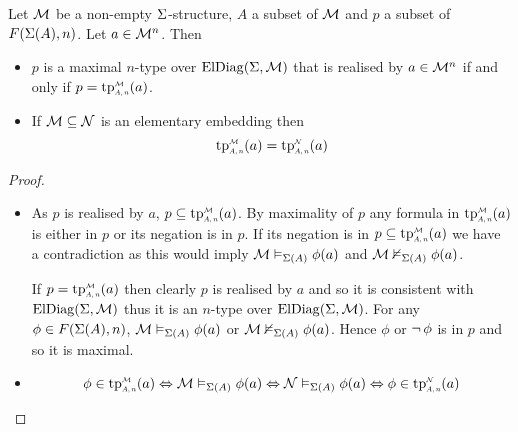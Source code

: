 \begin{prop}
    Let $\mathcal{M}$ be a non-empty $\Sigma$-structure,
    $A$ a subset of ${\mathcal{M}}$ and $p$ a subset of $F(\Sigma(A),n)$.
    Let $a \in {\mathcal{M}}^n$.
    Then \begin{itemize}
        \item $p$ is a maximal $n$-type over $\mathrm{ElDiag}(\Sigma,\mathcal{M})$ 
            that is realised by $a \in {\mathcal{M}}^n$ 
            if and only if $p = \subintp{A,n}{\MM}{\tp}(a)$.
        \item If $\mathcal{M} \subseteq \mathcal{N}$ is an elementary embedding then
            \[\subintp{A,n}{\MM}{\tp}(a) = \subintp{A,n}{\NN}{\tp}(a)\]
    \end{itemize}
\end{prop}
\begin{proof}~\begin{itemize}
    \item \begin{forward}
        As $p$ is realised by $a$, 
        $p \subs \subintp{A,n}{\MM}{\tp}(a)$.
        By maximality of $p$ any formula in $\subintp{A,n}{\MM}{\tp}(a)$ 
        is either in $p$
        or its negation is in $p$.
        If its negation is in $p \subs \subintp{A,n}{\MM}{\tp}(a)$ we have a
        contradiction as this would imply $\mathcal{M} \vDash_{\Sigma(A)} \phi(a)$ and
        $\mathcal{M} \nvDash_{\Sigma(A)} \phi(a)$.
    \end{forward}
    \begin{backward}
        If $p = \subintp{A,n}{\MM}{\tp}(a)$ 
        then clearly $p$ is realised by $a$ and so it is consistent with 
        $\mathrm{ElDiag}(\Sigma,\mathcal{M})$ thus it is an $n$-type over $\mathrm{ElDiag}(\Sigma,\mathcal{M})$.
        For any $\phi \in F(\Sigma(A),n)$,
        $\mathcal{M} \vDash_{\Sigma(A)} \phi(a)$ or $\mathcal{M} \nvDash_{\Sigma(A)} \phi(a)$.
        Hence $\phi$ or $\neg\, \phi$ is in $p$ and so it is maximal.
    \end{backward}
    \item \[\phi \in \subintp{A,n}{\MM}{\tp}(a) \iff \MM \model{\Si(A)} \phi(a)
        \iff \NN \model{\Si(A)} \phi(a) \iff 
        \phi \in \subintp{A,n}{\NN}{\tp}(a)\]
\end{itemize}\end{proof}

